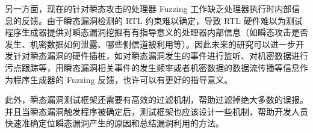 另一方面，现在的针对瞬态攻击的处理器 Fuzzing 工作缺乏处理器执行时内部信息的反馈。由于瞬态漏洞检测的 RTL 约束难以确定，导致 RTL 硬件难以为测试程序生成器提供对瞬态漏洞挖掘有有指导意义的处理器内部信息（如瞬态攻击是否发生、机密数据如何泄露、哪些侧信道被利用等）。因此未来的研究可以进一步开发针对瞬态漏洞的硬件插桩，如对瞬态漏洞发生的事件进行监听、对机密数据进行污点跟踪等，用瞬态漏洞相关事件的发生频率或者机密数据的数据流传播等信息作为程序生成器的 Fuzzing 反馈，也许可以有更好的指导意义。\par

此外，瞬态漏洞测试框架还需要有高效的过滤机制，帮助过滤掉绝大多数的误报。并且当瞬态漏洞触发程序被确定后，测试框架也应该设计一些机制，帮助开发人员快速准确定位瞬态漏洞产生的原因和总结漏洞利用的方法。

\newpage
\begingroup
    \printbibliography[title={参考文献}]
\endgroup
